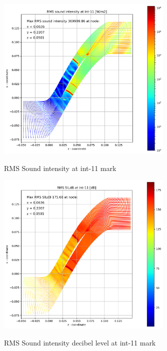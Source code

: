 \begin{figure}[ht]
  \centering
  \includegraphics[width=0.75\textwidth]{Figures/int-11-rms-sil.png} \label{int-11-rms-sil}
  \caption{RMS Sound intensity at int-11 mark}
  
  \vspace*{\floatsep}%

  \includegraphics[width=0.75\textwidth]{Figures/int-11-rms-sildb.png} \label{int-11-rms-sildb}
  \caption{RMS Sound intensity decibel level at int-11 mark}
\end{figure}


